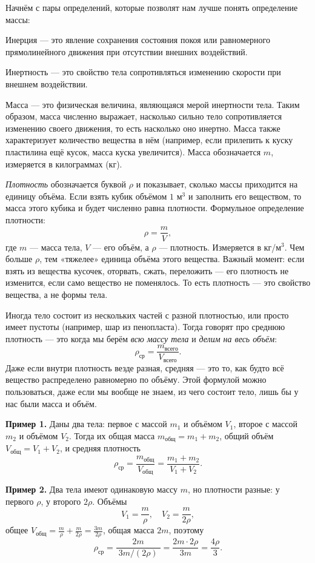 \documentclass[12 pt, a4paper]{article}%
\begin{document}
Начнём с пары определений, которые позволят нам лучше понять определение массы:

Инерция — это явление сохранения состояния покоя или равномерного прямолинейного движения при отсутствии внешних воздействий.

Инертность — это свойство тела сопротивляться изменению скорости при внешнем воздействии. 

Масса — это физическая величина, являющаяся мерой инертности тела. Таким образом, масса численно выражает, насколько сильно тело сопротивляется изменению своего движения, то есть насколько оно инертно. 
Масса также характеризует количество вещества в нём (например, если прилепить к куску пластилина ещё кусок, масса куска увеличится). Масса обозначается $m$, измеряется в килограммах (кг).

\textit{Плотность} обозначается буквой $\rho$ и показывает, сколько массы приходится на единицу объёма. Если взять кубик объёмом $1$ м$^3$ и заполнить его веществом, то масса этого кубика и будет численно равна плотности. Формульное определение плотности:
\[
\rho = \frac{m}{V},
\]
где $m$ — масса тела, $V$ — его объём, а $\rho$ — плотность. Измеряется в кг/м$^3$. Чем больше $\rho$, тем «тяжелее» единица объёма этого вещества. Важный момент: если взять из вещества кусочек, оторвать, сжать, переложить — его плотность не изменится, если само вещество не поменялось. То есть плотность — это свойство вещества, а не формы тела.

Иногда тело состоит из нескольких частей с разной плотностью, или просто имеет пустоты (например, шар из пенопласта). Тогда говорят про среднюю плотность — это когда мы берём \textit{всю массу тела} и \textit{делим на весь объём}:
\[
\rho_{\text{ср}} = \frac{m_{\text{всего}}}{V_{\text{всего}}}.
\]
Даже если внутри плотность везде разная, средняя — это то, как будто всё вещество распределено равномерно по объёму. Этой формулой можно пользоваться, даже если мы вообще не знаем, из чего состоит тело, лишь бы у нас были масса и объём.

\textbf{Пример 1.} Даны два тела: первое с массой $m_1$ и объёмом $V_1$, второе с массой $m_2$ и объёмом $V_2$. Тогда их общая масса $m_{\text{общ}} = m_1 + m_2$, общий объём $V_{\text{общ}} = V_1 + V_2$, и средняя плотность
\[
\rho_{\text{ср}} = \frac{m_{\text{общ}}}{V_{\text{общ}}}
= \frac{m_1 + m_2}{V_1 + V_2}.
\]

\textbf{Пример 2.} Два тела имеют одинаковую массу $m$, но плотности разные: у первого $\rho$, у второго $2\rho$. Объёмы
\[
V_1 = \frac{m}{\rho},\quad V_2 = \frac{m}{2\rho},
\]
общее $V_{\text{общ}} = \frac{m}{\rho} + \frac{m}{2\rho} = \frac{3m}{2\rho}$, общая масса $2m$, поэтому
\[
\rho_{\text{ср}} = \frac{2m}{\;3m/(2\rho)\;} = \frac{2m\cdot2\rho}{3m} = \frac{4\rho}{3}.
\]
\end{document}
